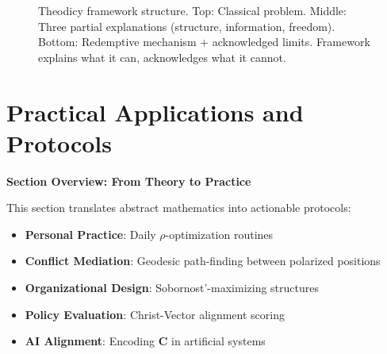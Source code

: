 \documentclass[11pt,a4paper]{article}
\theoremstyle{definition}
\theoremstyle{remark}
\begin{document}
\begin{small}
\begin{enumerate}
\begin{figure}[H]
\caption{Theodicy framework structure. Top: Classical problem. Middle: Three partial explanations (structure, information, freedom). Bottom: Redemptive mechanism + acknowledged limits. Framework explains what it can, acknowledges what it cannot.}
\label{fig:theodicy_framework}
\end{figure}


\section{Practical Applications and Protocols}

\begin{mdframed}[backgroundcolor=cyan!5,linewidth=2pt]
\textbf{Section Overview: From Theory to Practice}

This section translates abstract mathematics into actionable protocols:

\begin{itemize}[nosep]
    \item \textbf{Personal Practice}: Daily \(\rho\)-optimization routines
    \item \textbf{Conflict Mediation}: Geodesic path-finding between polarized positions
    \item \textbf{Organizational Design}: Sobornost'-maximizing structures
    \item \textbf{Policy Evaluation}: Christ-Vector alignment scoring
    \item \textbf{AI Alignment}: Encoding \(\mathbf{C}\) in artificial systems
\end{itemize}


\end{mdframed}
\end{enumerate}
\end{small}
\end{document}
